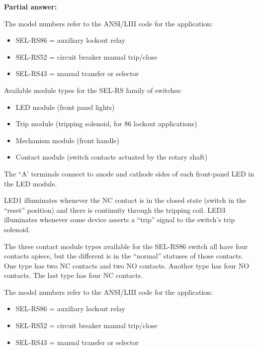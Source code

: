 





\noindent
{\bf Partial answer:}

\vskip 10pt

The model numbers refer to the ANSI/LIII code for the application:

\begin{itemize}
\item{} SEL-RS86 = auxiliary lockout relay
\item{} SEL-RS52 = circuit breaker manual trip/close
\item{} SEL-RS43 = manual transfer or selector
\end{itemize}








Available module types for the SEL-RS family of switches:

\begin{itemize}
\item{} LED module (front panel lights)
\item{} Trip module (tripping solenoid, for 86 lockout applications)
\item{} Mechanism module (front handle)
\item{} Contact module (switch contacts actuated by the rotary shaft)
\end{itemize}

\vskip 10pt

The ``A' terminals connect to anode and cathode sides of each front-panel LED in the LED module.

\vskip 10pt

LED1 illuminates whenever the NC contact is in the closed state (switch in the ``reset'' position) and there is continuity through the tripping coil.  LED3 illuminates whenever some device asserts a ``trip'' signal to the switch's trip solenoid.

\vskip 10pt

The three contact module types available for the SEL-RS86 switch all have four contacts apiece, but the different is in the ``normal'' statuses of those contacts.  One type has two NC contacts and two NO contacts.  Another type has four NO contacts.  The last type has four NC contacts.

\vskip 10pt

The model numbers refer to the ANSI/LIII code for the application:

\begin{itemize}
\item{} SEL-RS86 = auxiliary lockout relay
\item{} SEL-RS52 = circuit breaker manual trip/close
\item{} SEL-RS43 = manual transfer or selector
\end{itemize}





